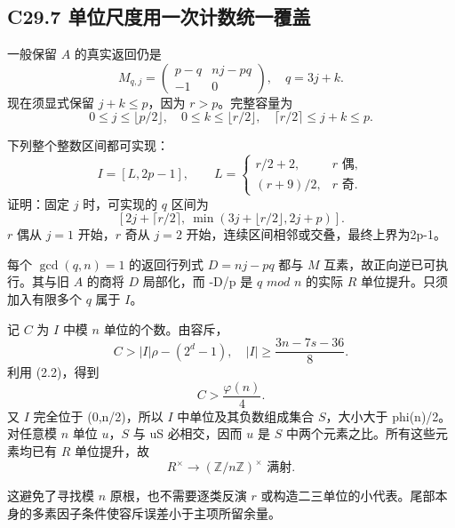 \subsection*{\texorpdfstring{{C29.7} {单位尺度用一次计数统一覆盖}}{C29.7 单位尺度用一次计数统一覆盖}}\label{C29-h190}

{一般保留} {\ensuremath{A}} {的真实返回仍是} \[
M_{q,j}=
\begin{pmatrix}p-q&nj-pq\\-1&0\end{pmatrix},\quad q=3j+k.
\] {现在须显式保留} {\ensuremath{j+k\le p}，因为} {\ensuremath{r>p}。完整容量为} \[
0\le j\le\lfloor p/2\rfloor,\quad
0\le k\le\lfloor r/2\rfloor,\quad
\lceil r/2\rceil\le j+k\le p.
\]

{下列整个整数区间都可实现：} \[
I=[L,2p-1],\qquad
L=\begin{cases}
r/2+2,&r\text{ 偶},\\
(r+9)/2,&r\text{ 奇}.
\end{cases}
\tag{C29.7.1}
\] {证明：固定} {\ensuremath{j}} {时，可实现的} {\ensuremath{q}} {区间为} \[
[2j+\lceil r/2\rceil,\ \min(3j+\lfloor r/2\rfloor,2j+p)].
\] {\ensuremath{r}} {偶从} {\ensuremath{j=1}} {开始，\ensuremath{r}} {奇从} {\ensuremath{j=2}} {开始，连续区间相邻或交叠，最终上界为2p-1。}

{每个} {\ensuremath{\operatorname{gcd}(q,n)=1}} {的返回行列式} {\ensuremath{D=nj-pq}} {都与} {\ensuremath{M}} {互素，故正向逆已可执行。其与旧} {\ensuremath{A}} {的商将} {\ensuremath{D}} {局部化，而} {-D/p} {是} {\ensuremath{q}} {\ensuremath{mod}} {\ensuremath{n}} {的实际} {\ensuremath{R}} {单位提升。只须加入有限多个} {\ensuremath{q}} {属于} {\ensuremath{I}。}

{记} {\ensuremath{C}} {为} {\ensuremath{I}} {中模} {\ensuremath{n}} {单位的个数。由容斥，} \[
C>|I|\rho-(2^d-1),\quad
|I|\ge\frac{3n-7s-36}{8}.
\] {利用} {(2.2)，得到} \[
\boxed{C>\frac{\varphi(n)}4.}
\tag{C29.7.2}
\] {又} {\ensuremath{I}} {完全位于} {(0,n/2)，所以} {\ensuremath{I}} {中单位及其负数组成集合} {\ensuremath{S}，大小大于} {phi(n)/2。对任意模} {\ensuremath{n}} {单位} {\ensuremath{u}，\ensuremath{S}} {与} {uS} {必相交，因而} {\ensuremath{u}} {是} {\ensuremath{S}} {中两个元素之比。所有这些元素均已有} {\ensuremath{R}} {单位提升，故} \[
\boxed{R^\times\longrightarrow(\mathbb Z/n\mathbb Z)^\times
\text{ 满射}.}
\tag{C29.7.3}
\]

{这避免了寻找模} {\ensuremath{n}} {原根，也不需要逐类反演} {\ensuremath{r}} {或构造二三单位的小代表。尾部本身的多素因子条件使容斥误差小于主项所留余量。}

